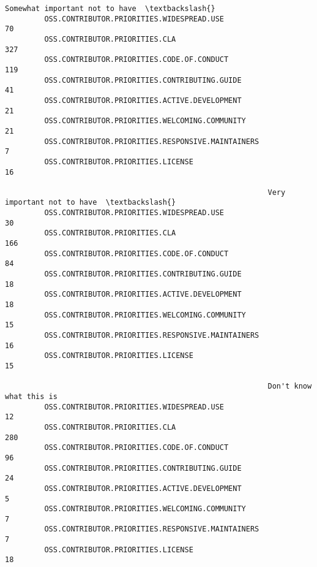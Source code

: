 \documentclass[11pt]{article}
\begin{document}
\begin{Verbatim}[commandchars=\\\{\}]
                                                            Somewhat important not to have  \textbackslash{}
         OSS.CONTRIBUTOR.PRIORITIES.WIDESPREAD.USE                                      70   
         OSS.CONTRIBUTOR.PRIORITIES.CLA                                                327   
         OSS.CONTRIBUTOR.PRIORITIES.CODE.OF.CONDUCT                                    119   
         OSS.CONTRIBUTOR.PRIORITIES.CONTRIBUTING.GUIDE                                  41   
         OSS.CONTRIBUTOR.PRIORITIES.ACTIVE.DEVELOPMENT                                  21   
         OSS.CONTRIBUTOR.PRIORITIES.WELCOMING.COMMUNITY                                 21   
         OSS.CONTRIBUTOR.PRIORITIES.RESPONSIVE.MAINTAINERS                               7   
         OSS.CONTRIBUTOR.PRIORITIES.LICENSE                                             16   
         
                                                            Very important not to have  \textbackslash{}
         OSS.CONTRIBUTOR.PRIORITIES.WIDESPREAD.USE                                  30   
         OSS.CONTRIBUTOR.PRIORITIES.CLA                                            166   
         OSS.CONTRIBUTOR.PRIORITIES.CODE.OF.CONDUCT                                 84   
         OSS.CONTRIBUTOR.PRIORITIES.CONTRIBUTING.GUIDE                              18   
         OSS.CONTRIBUTOR.PRIORITIES.ACTIVE.DEVELOPMENT                              18   
         OSS.CONTRIBUTOR.PRIORITIES.WELCOMING.COMMUNITY                             15   
         OSS.CONTRIBUTOR.PRIORITIES.RESPONSIVE.MAINTAINERS                          16   
         OSS.CONTRIBUTOR.PRIORITIES.LICENSE                                         15   
         
                                                            Don't know what this is  
         OSS.CONTRIBUTOR.PRIORITIES.WIDESPREAD.USE                               12  
         OSS.CONTRIBUTOR.PRIORITIES.CLA                                         280  
         OSS.CONTRIBUTOR.PRIORITIES.CODE.OF.CONDUCT                              96  
         OSS.CONTRIBUTOR.PRIORITIES.CONTRIBUTING.GUIDE                           24  
         OSS.CONTRIBUTOR.PRIORITIES.ACTIVE.DEVELOPMENT                            5  
         OSS.CONTRIBUTOR.PRIORITIES.WELCOMING.COMMUNITY                           7  
         OSS.CONTRIBUTOR.PRIORITIES.RESPONSIVE.MAINTAINERS                        7  
         OSS.CONTRIBUTOR.PRIORITIES.LICENSE                                      18  
\end{Verbatim}
        
\end{document}
